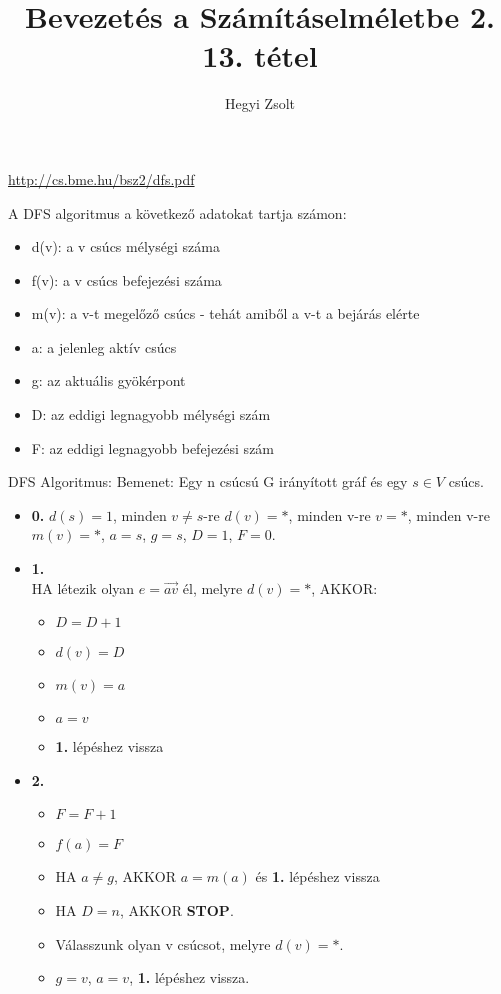 \documentclass[]{article}
\title{Bevezetés a Számításelméletbe 2.\\{\large 13. tétel}}
\author{Hegyi Zsolt}
\begin{document}
\maketitle
\url{http://cs.bme.hu/bsz2/dfs.pdf}
\begin{framed}
A DFS algoritmus a következő adatokat tartja számon:
\begin{itemize}
\item d(v): a v csúcs mélységi száma
\item f(v): a v csúcs befejezési száma
\item m(v): a v-t megelőző csúcs - tehát amiből a v-t a bejárás elérte
\item a: a jelenleg aktív csúcs
\item g: az aktuális gyökérpont
\item D: az eddigi legnagyobb mélységi szám
\item F: az eddigi legnagyobb befejezési szám
\end{itemize}
\end{framed}
\begin{framed}
DFS Algoritmus: Bemenet: Egy n csúcsú G irányított gráf és egy $s \in V$ csúcs.
\begin{itemize}
\item{\textbf{0.}} $d(s) = 1$, minden $v \neq s$-re $d(v) = *$, minden v-re $v = *$, minden v-re $m(v) = *$, $a = s$, $g = s$, $D = 1$, $F = 0$.
\item{\textbf{1.}}
\\
HA létezik olyan $e = \overrightarrow{av}$ él, melyre $d(v) = *$, AKKOR:
	\begin{itemize}
	\item $D = D + 1$
	\item $d(v) = D$
	\item $m(v) = a$
	\item $a = v$
	\item \textbf{1.} lépéshez vissza
	\end{itemize}
\item{\textbf{2.}}
	\begin{itemize}
	\item $F = F + 1$
	\item $f(a) = F$
	\item HA $a \neq g$, AKKOR $a = m(a)$ és \textbf{1.} lépéshez vissza
	\item HA $D = n$, AKKOR \textbf{STOP}.
	\item Válasszunk olyan v csúcsot, melyre $d(v) = *$.
	\item $g = v$, $a = v$, \textbf{1.} lépéshez vissza.
	\end{itemize}
\end{itemize}
\end{framed}
\end{document}
